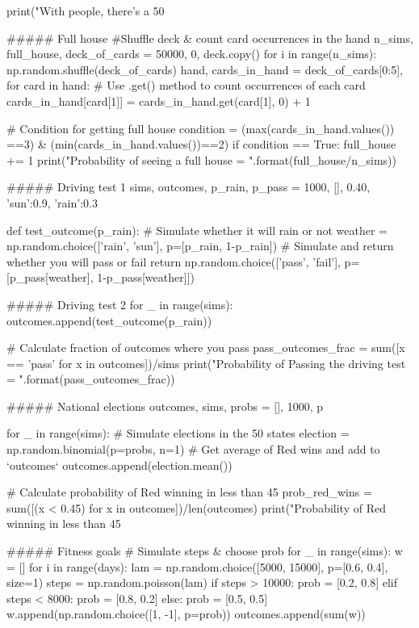 print("With {} people, there's a 50%

##### Full house
#Shuffle deck & count card occurrences in the hand
n_sims, full_house, deck_of_cards = 50000, 0, deck.copy() 
for i in range(n_sims):
    np.random.shuffle(deck_of_cards)
    hand, cards_in_hand = deck_of_cards[0:5], {}
    for card in hand:
        # Use .get() method to count occurrences of each card
        cards_in_hand[card[1]] = cards_in_hand.get(card[1], 0) + 1
        
    # Condition for getting full house
    condition = (max(cards_in_hand.values()) ==3) & (min(cards_in_hand.values())==2)
    if  condition == True: 
        full_house += 1
print("Probability of seeing a full house = {}".format(full_house/n_sims))

##### Driving test 1
sims, outcomes, p_rain, p_pass = 1000, [], 0.40, {'sun':0.9, 'rain':0.3}

def test_outcome(p_rain):
    # Simulate whether it will rain or not
    weather = np.random.choice(['rain', 'sun'], p=[p_rain, 1-p_rain])
    # Simulate and return whether you will pass or fail
    return np.random.choice(['pass', 'fail'], p=[p_pass[weather], 1-p_pass[weather]])

##### Driving test 2
for _ in range(sims):
    outcomes.append(test_outcome(p_rain))

# Calculate fraction of outcomes where you pass
pass_outcomes_frac = sum([x == 'pass' for x in outcomes])/sims
print("Probability of Passing the driving test = {}".format(pass_outcomes_frac))

##### National elections
outcomes, sims, probs = [], 1000, p

for _ in range(sims):
    # Simulate elections in the 50 states
    election = np.random.binomial(p=probs, n=1)
    # Get average of Red wins and add to `outcomes`
    outcomes.append(election.mean())

# Calculate probability of Red winning in less than 45%
prob_red_wins = sum([(x < 0.45) for x in outcomes])/len(outcomes)
print("Probability of Red winning in less than 45%

##### Fitness goals
# Simulate steps & choose prob 
for _ in range(sims):
    w = []
    for i in range(days):
        lam = np.random.choice([5000, 15000], p=[0.6, 0.4], size=1)
        steps = np.random.poisson(lam)
        if steps > 10000: 
            prob = [0.2, 0.8]
        elif steps < 8000: 
            prob = [0.8, 0.2]
        else:
            prob = [0.5, 0.5]
        w.append(np.random.choice([1, -1], p=prob))
    outcomes.append(sum(w))

